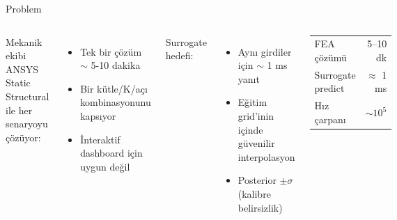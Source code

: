\begin{frame}{Problem}
  \begin{columns}[T,onlytextwidth]
    Mekanik ekibi ANSYS Static Structural ile her senaryoyu çözüyor:
    \begin{itemize}\small
      \item Tek bir çözüm \(\sim\) 5-10 dakika
      \item Bir kütle/K/açı kombinasyonunu kapsıyor
      \item İnteraktif dashboard için \alert{uygun değil}
    \end{itemize}
    \vspace{0.4cm}
    Surrogate hedefi:
    \begin{itemize}\small
      \item Aynı girdiler için \(\sim\) 1 ms yanıt
      \item Eğitim grid'inin içinde \alert{güvenilir interpolasyon}
      \item Posterior \(\pm\sigma\) (kalibre belirsizlik)
    \end{itemize}
    \begin{center}
      \footnotesize
      \begin{tabular}{lr}
        \toprule
        FEA çözümü & 5--10 dk \\
        Surrogate predict & \(\approx\) 1 ms \\
        Hız çarpanı & \(\sim 10^5\) \\
        \bottomrule
      \end{tabular}
    \end{center}
  \end{columns}
\end{frame}

